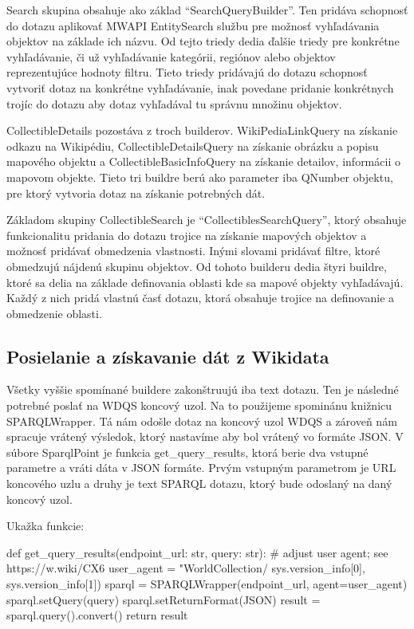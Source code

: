 Search skupina obsahuje ako základ “SearchQueryBuilder”. 
Ten pridáva schopnosť do dotazu aplikovať MWAPI EntitySearch službu pre možnosť vyhľadávania objektov na základe ich názvu. 
Od tejto triedy dedia ďalšie triedy pre konkrétne vyhľadávanie, či už vyhľadávanie kategórii, regiónov alebo objektov reprezentujúce hodnoty filtru. Tieto triedy pridávajú do dotazu 
schopnosť vytvoriť dotaz na konkrétne vyhľadávanie, inak povedane pridanie konkrétnych trojíc do dotazu aby dotaz vyhľadával tu správnu množinu objektov. 

CollectibleDetails pozostáva z troch builderov. WikiPediaLinkQuery na získanie odkazu na Wikipédiu, CollectibleDetailsQuery na získanie obrázku a popisu mapového objektu a CollectibleBasicInfoQuery na získanie detailov, informácii o mapovom objekte. 
Tieto tri buildre berú ako parameter iba QNumber objektu, pre ktorý vytvoria dotaz na získanie potrebných dát. 

Základom skupiny CollectibleSearch je “CollectiblesSearchQuery”, ktorý obsahuje funkcionalitu pridania do dotazu trojice na získanie mapových objektov a možnosť pridávať obmedzenia vlastnosti. 
Inými slovami pridávať filtre, ktoré obmedzujú nájdenú skupinu objektov. 
Od tohoto builderu dedia štyri buildre, ktoré sa delia na základe definovania oblasti kde sa mapové objekty vyhľadávajú. Každý z nich pridá vlastnú časť dotazu, ktorá obsahuje 
trojice na definovanie a obmedzenie oblasti. 

\subsection{Posielanie a získavanie dát z Wikidata }

Všetky vyššie spomínané buildere zakonštruujú iba text dotazu. Ten je následné potrebné poslať na WDQS koncový uzol. 
Na to použijeme spominánu knižnicu SPARQLWrapper. Tá nám odošle dotaz na koncový uzol WDQS a zároveň nám spracuje 
vrátený výsledok, ktorý nastavíme aby bol vrátený vo formáte JSON. V súbore SparqlPoint je funkcia get\_query\_results, ktorá berie dva vstupné parametre a vráti dáta v JSON formáte. 
Prvým vstupným parametrom je URL koncového uzlu a druhy je text SPARQL dotazu, ktorý bude odoslaný na daný koncový uzol. 

Ukažka funkcie:
\begin{code}
def get_query_results(endpoint_url: str, query: str):
    # adjust user agent; see https://w.wiki/CX6
    user_agent = "WorldCollection/%
        sys.version_info[0], sys.version_info[1])
    sparql = SPARQLWrapper(endpoint_url, agent=user_agent)
    sparql.setQuery(query)
    sparql.setReturnFormat(JSON)
    result = sparql.query().convert()
    return result
\end{code}

